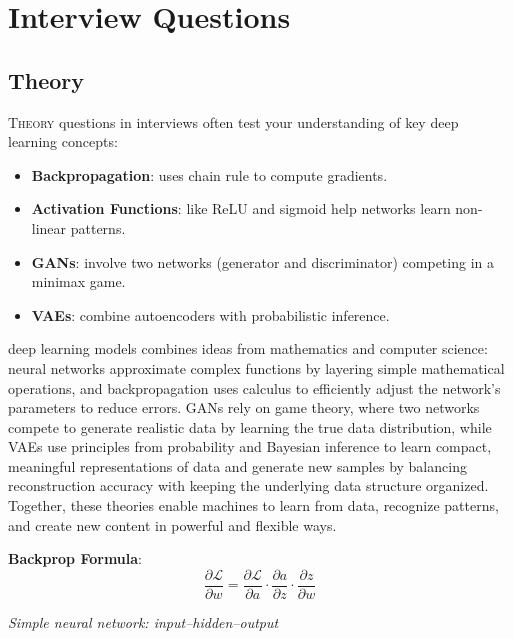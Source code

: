 \documentclass{book}
\begin{document}
\chapter{Interview Questions}

\section{Theory}
\lettrine{T}{heory} questions in interviews often test your understanding of key deep learning concepts:

\begin{itemize}
  \item \textbf{Backpropagation}: uses chain rule to compute gradients.
  \item \textbf{Activation Functions}: like ReLU and sigmoid help networks learn non-linear patterns.
  \item \textbf{GANs}: involve two networks (generator and discriminator) competing in a minimax game.
  \item \textbf{VAEs}: combine autoencoders with probabilistic inference.
\end{itemize}

deep learning models combines ideas from mathematics and computer science: neural networks approximate complex functions by layering simple mathematical operations, and backpropagation uses calculus to efficiently adjust the network’s parameters to reduce errors. GANs rely on game theory, where two networks compete to generate realistic data by learning the true data distribution, while VAEs use principles from probability and Bayesian inference to learn compact, meaningful representations of data and generate new samples by balancing reconstruction accuracy with keeping the underlying data structure organized. Together, these theories enable machines to learn from data, recognize patterns, and create new content in powerful and flexible ways.

\vspace{0.3cm}
\noindent\textbf{Backprop Formula}:
\[
\frac{\partial \mathcal{L}}{\partial w} = \frac{\partial \mathcal{L}}{\partial a} \cdot \frac{\partial a}{\partial z} \cdot \frac{\partial z}{\partial w}
\]

\vspace{0.4cm}
\begin{center}

\smallskip
\textit{Simple neural network: input–hidden–output}
\end{center}
\end{document}

